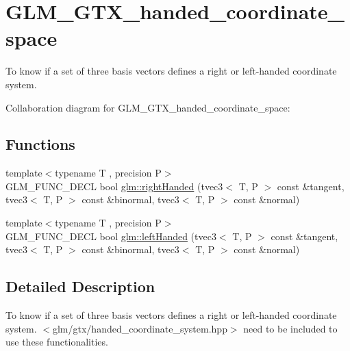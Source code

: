 \hypertarget{group__gtx__handed__coordinate__space}{\section{G\-L\-M\-\_\-\-G\-T\-X\-\_\-handed\-\_\-coordinate\-\_\-space}
\label{group__gtx__handed__coordinate__space}
}


To know if a set of three basis vectors defines a right or left-\/handed coordinate system.  


Collaboration diagram for G\-L\-M\-\_\-\-G\-T\-X\-\_\-handed\-\_\-coordinate\-\_\-space\-:
\subsection*{Functions}
\begin{DoxyCompactItemize}
\item 
{\footnotesize template$<$typename T , precision P$>$ }\\G\-L\-M\-\_\-\-F\-U\-N\-C\-\_\-\-D\-E\-C\-L bool \hyperlink{group__gtx__handed__coordinate__space_ga17cd83888de8755c0435c589fafd3603}{glm\-::right\-Handed} (tvec3$<$ T, P $>$ const \&tangent, tvec3$<$ T, P $>$ const \&binormal, tvec3$<$ T, P $>$ const \&normal)
\item 
{\footnotesize template$<$typename T , precision P$>$ }\\G\-L\-M\-\_\-\-F\-U\-N\-C\-\_\-\-D\-E\-C\-L bool \hyperlink{group__gtx__handed__coordinate__space_ga7425e0ebfe6a56919900a072ae1f8017}{glm\-::left\-Handed} (tvec3$<$ T, P $>$ const \&tangent, tvec3$<$ T, P $>$ const \&binormal, tvec3$<$ T, P $>$ const \&normal)
\end{DoxyCompactItemize}


\subsection{Detailed Description}
To know if a set of three basis vectors defines a right or left-\/handed coordinate system. $<$glm/gtx/handed\-\_\-coordinate\-\_\-system.\-hpp$>$ need to be included to use these functionalities. 

